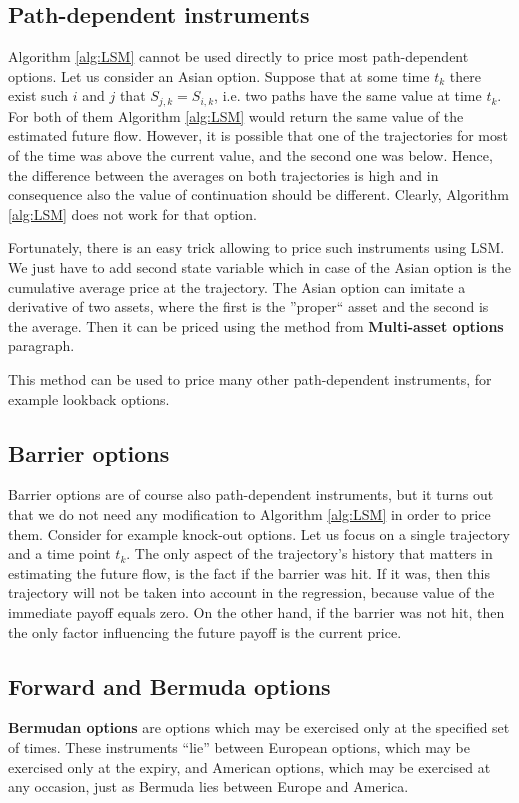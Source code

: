 \documentclass[a4paper,11pt, twoside]{book}
\theoremstyle{definition}
\theoremstyle{remark}
\newcounter{example}[chapter]
\begin{document}
\subsection{Path-dependent instruments}
Algorithm \ref{alg:LSM} cannot be used directly to price most path-dependent options. Let us consider an Asian option. Suppose that at some time $t_k$ there exist such $i$ and $j$ that $S_{j,k} = S_{i,k}$, i.e. two paths have the same value at time $t_k$. For both of them Algorithm \ref{alg:LSM} would return the same value of the estimated future flow. However, it is possible that one of the trajectories for most of the time was above the current value, and the second one was below. Hence, the difference between the averages on both trajectories is high and in consequence also the value of continuation should be different. Clearly, Algorithm \ref{alg:LSM} does not work for that option.

Fortunately, there is an easy trick allowing to price such instruments using LSM. We just have to add second state variable which in case of the Asian option is the cumulative average price at the trajectory. The Asian option can imitate a derivative of two assets, where the first is the ''proper`` asset and the second is the average. Then it can be priced using the method from \textbf{Multi-asset options} paragraph.

This method can be used to price many other path-dependent instruments, for example lookback options.

\subsection{Barrier options}
Barrier options are of course also path-dependent instruments, but it turns out that we do not need any modification to Algorithm \ref{alg:LSM} in order to price them. Consider for example knock-out options. Let us focus on a single trajectory and a time point $t_k$. The only aspect of the trajectory's history that matters in estimating the future flow, is the fact if the barrier was hit. If it was, then this trajectory will not be taken into account in the regression, because value of the immediate payoff equals zero. On the other hand, if the barrier was not hit, then the only factor influencing the future payoff is the current price.

\subsection{Forward and Bermuda options}
\textbf{Bermudan options} are options which may be exercised only at the specified set of times. These instruments ``lie'' between European options, which may be exercised only at the expiry, and American options, which may be exercised at any occasion, just as Bermuda lies between Europe and America.
\end{document}
